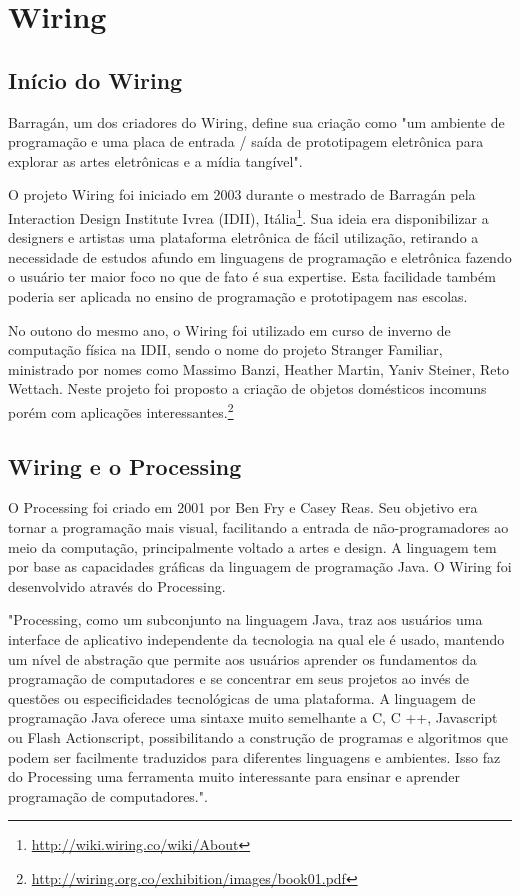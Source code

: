 \chapter[Wiring]{Wiring}

\section{Início do Wiring}
Barragán, um dos criadores do Wiring, define sua criação como "um ambiente de programação e uma placa de entrada / saída de prototipagem eletrônica para explorar as artes eletrônicas e a mídia tangível"\cite{Barragan2004}.

O projeto Wiring foi iniciado em 2003 durante o mestrado de Barragán pela Interaction Design Institute Ivrea (IDII), Itália\footnote{\url{http://wiki.wiring.co/wiki/About}}. Sua ideia era disponibilizar a designers e artistas uma plataforma eletrônica de fácil utilização, retirando a necessidade de estudos afundo em linguagens de programação e eletrônica fazendo o usuário ter maior foco no que de fato é sua expertise. Esta facilidade também poderia ser aplicada no ensino de programação e prototipagem nas escolas.

No outono do mesmo ano, o Wiring foi utilizado em curso de inverno de computação física na IDII, sendo o nome do projeto Stranger Familiar, ministrado por nomes como Massimo Banzi, Heather Martin, Yaniv Steiner, Reto Wettach. Neste projeto foi proposto a criação de objetos domésticos incomuns porém com aplicações interessantes.\footnote{\url{http://wiring.org.co/exhibition/images/book01.pdf}}

\section{Wiring e o Processing}

O Processing foi criado em 2001 por Ben Fry e Casey Reas. Seu objetivo era tornar a programação mais visual, facilitando a entrada de não-programadores ao meio da computação, principalmente voltado a artes e design.\cite{reas2007processing} A linguagem tem por base as capacidades gráficas da linguagem de programação Java. O Wiring foi desenvolvido através do Processing.

"Processing, como um subconjunto na linguagem Java, traz aos usuários uma interface de aplicativo independente da tecnologia na qual ele é usado, mantendo um nível de abstração que permite aos usuários aprender os fundamentos da programação de computadores e se concentrar em seus projetos ao invés de questões ou especificidades tecnológicas de uma plataforma. A linguagem de programação Java oferece uma sintaxe muito semelhante a C, C ++, Javascript ou Flash Actionscript, possibilitando a construção de programas e algoritmos que podem ser facilmente traduzidos para diferentes linguagens e ambientes. Isso faz do Processing uma ferramenta muito interessante para ensinar e aprender programação de computadores."\cite{Barragan2004}.

